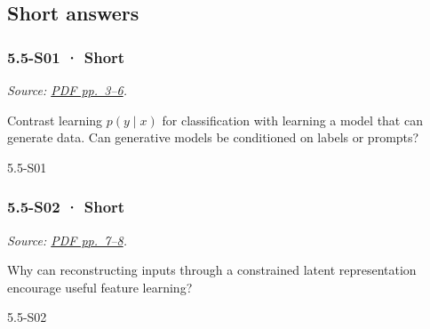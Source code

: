 \subsection{Short answers}\label{short-answers-17}

\noindent\begin{minipage}{\linewidth}

\subsubsection{5.5-S01 · Short}\label{s01-short-16}

\emph{Source:
\href{../Lecture\%20Slides/5.5.\%20Generative\%20Models.pdf\#page=3}{PDF
pp.~3--6}.}

Contrast learning \(p(y\mid x)\) for classification with learning a
model that can generate data. Can generative models be conditioned on
labels or prompts?

\begin{solution}[20mm]{5.5-S01}

\end{solution}
\end{minipage}\par\medskip

\noindent\begin{minipage}{\linewidth}

\subsubsection{5.5-S02 · Short}\label{s02-short-16}

\emph{Source:
\href{../Lecture\%20Slides/5.5.\%20Generative\%20Models.pdf\#page=7}{PDF
pp.~7--8}.}

Why can reconstructing inputs through a constrained latent
representation encourage useful feature learning?

\begin{solution}[20mm]{5.5-S02}

\end{solution}
\end{minipage}\par\medskip


